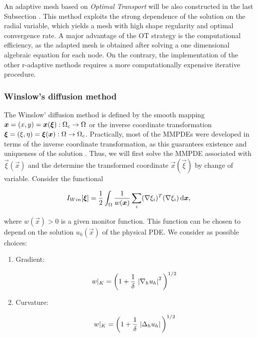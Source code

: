 \documentclass[a4paper,11pt]{article}
\begin{document}
{An adaptive mesh based on \textit{Optimal Transport} will be also constructed in the last Subsection \cite{BHR:2009}. This method exploits the strong dependence of the solution on the radial variable, which yields a mesh with high shape regularity and optimal convergence rate. A major advantage of the OT strategy is the computational efficiency, as the adapted mesh is obtained after solving a one dimensional algebraic equation for each node. On the contrary, the implementation of the other r-adaptive methods requires a more computationally expensive iterative procedure. 

\subsubsection{Winslow's diffusion method}
\label{sec:Wins}
The Winslow' diffusion method is defined by the smooth mapping $\boldsymbol x = (x,y) = \boldsymbol x(\boldsymbol \xi) : \Omega_{c} \rightarrow \Omega$ or the inverse coordinate
transformation $\boldsymbol \xi = (\xi,\eta) =  \boldsymbol \xi(\boldsymbol x) : \Omega \rightarrow
\Omega_{c}$. Practically, most of the MMPDEs were developed in terms of
the inverse coordinate transformation, as this guarantees existence
and uniqueness of the solution \cite{Winslow:1966,Dvinsky:1991}. Thus, we will first solve the MMPDE associated with $\vec{\xi}(\vec{x})$ and the determine the transformed coordinate $\vec{x}(\vec{\xi})$ by change of variable. Consider the functional

\begin{equation}
    I_{Win}[\boldsymbol \xi] = \frac{1}{2} \int_{\Omega} \frac{1}{ w(\boldsymbol x)} \sum_{i} (\nabla \xi_{i})^{T} (\nabla \xi_{i}) \,\mathrm{d} \boldsymbol x,
\label{eq:Winslow_functional_2}
\end{equation}

where $w(\vec{x}) > 0$ is a given monitor function. This function can be chosen to depend on the solution $u_{h}(\vec{x})$ of the physical PDE. We consider as possible choices:

\begin{enumerate}
    \item Gradient:
    
    \begin{equation}
          w|_{K} = \bigg( 1 + \frac{1}{\delta} \, \left|\nabla_{h} u_{h}\right|^{2} \bigg)^{1/2}
    \label{eq:monitor_gradient}
    \end{equation}
    
    
    \item Curvature:
    
    \begin{equation}
        w|_{K} = \bigg( 1 +  \frac{1}{\delta} \,\left|\Delta_{h}u_{h}\right|\bigg)^{1/2}
    \label{eq:monitor_curvature}
    \end{equation}
    

\end{enumerate}}
\end{document}
